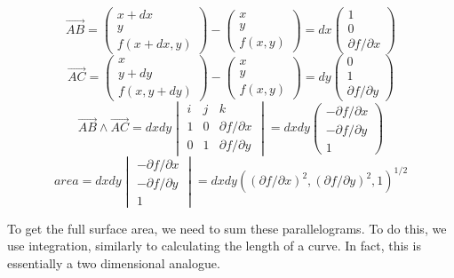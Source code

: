 \documentclass[a4paper,10pt]{article}
\begin{document}
\[
	\vec{AB} =
	\begin{pmatrix}
		x+dx \\
		y \\
		f(x+dx,y)
	\end{pmatrix}
	-
	\begin{pmatrix}
		x \\
		y \\
		f(x,y)
	\end{pmatrix}
	=
	dx
	\begin{pmatrix}
		1 \\
		0 \\
		\partial f / \partial x
	\end{pmatrix}
\]
\[
	\vec{AC} =
	\begin{pmatrix}
		x \\
		y+dy \\
		f(x,y+dy)
	\end{pmatrix}
	-
	\begin{pmatrix}
		x \\
		y \\
		f(x,y)
	\end{pmatrix}
	=
	dy
	\begin{pmatrix}
		0 \\
		1 \\
		\partial f / \partial y
	\end{pmatrix}
\]
\[
	\vec{AB} \wedge \vec{AC} =
	dxdy
	\begin{vmatrix}
		i & j & k \\
		1 & 0 & \partial f / \partial x \\
		0 & 1 & \partial f / \partial y
	\end{vmatrix}
	=
	dxdy
	\begin{pmatrix}
		- \partial f / \partial x \\
		- \partial f / \partial y \\
		1
	\end{pmatrix}
\]
\[
	area = dxdy
	\begin{vmatrix}
		- \partial f / \partial x \\
		- \partial f / \partial y \\
		1
	\end{vmatrix}
	=
	dxdy
	\left(
		(\partial f / \partial x)^2,
		(\partial f / \partial y)^2,
		1
	\right)^{1/2}
\]

To get the full surface area, we need to sum these parallelograms. To do
this, we use integration, similarly to calculating the length of a
curve. In fact, this is essentially a two dimensional analogue.
\end{document}
